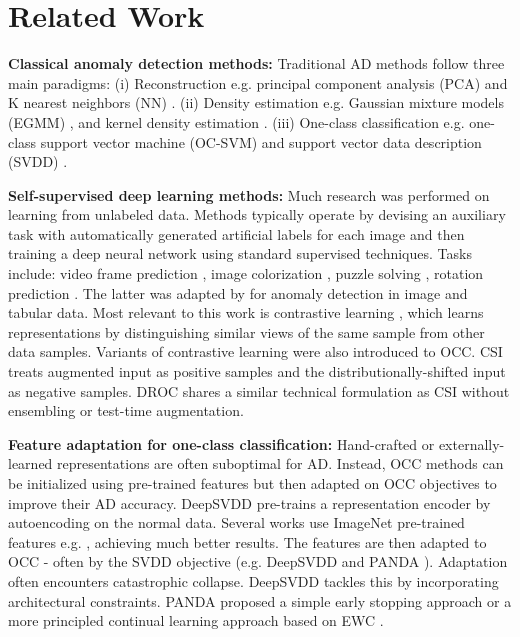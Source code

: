 \documentclass[letterpaper]{article} \usepackage{aaai23}  \usepackage{times}  \usepackage{helvet}  \usepackage{courier}  \usepackage[hyphens]{url}  \usepackage{graphicx} \usepackage{amsmath, amssymb}
\begin{document}
\section{Related Work}

\textbf{Classical anomaly detection methods:} Traditional AD methods follow three main paradigms: (i) Reconstruction e.g. principal component analysis (PCA) \cite{jolliffe2011principal} and K nearest neighbors (NN) \cite{eskin2002geometric}. (ii) Density estimation e.g. Gaussian mixture models (EGMM) \cite{glodek2013ensemble}, and kernel density estimation \cite{latecki2007outlier}. (iii) One-class classification e.g. one-class support vector machine (OC-SVM) \cite{scholkopf2000support} and support vector data description (SVDD) \cite{tax2004support}.

\textbf{Self-supervised deep learning methods:} Much research was performed on learning from unlabeled data. Methods typically operate by devising an auxiliary task with automatically generated artificial labels for each image and then training a deep neural network using standard supervised techniques. Tasks include: video frame prediction \cite{mathieu2015deep}, image colorization \cite{zhang2016colorful,larsson2016learning}, puzzle solving \cite{noroozi2016unsupervised},  rotation prediction \cite{gidaris2018unsupervised}. The latter was adapted by \cite{golan2018deep, hendrycks2019using, bergman2020classification} for anomaly detection in image and tabular data. Most relevant to this work is contrastive learning \cite{chen2020simple}, which learns representations by distinguishing similar views of the same sample from other data samples. Variants of contrastive learning were also introduced to OCC. CSI \cite{tack2020csi} treats augmented input as positive samples and the distributionally-shifted input as negative samples. DROC \cite{sohn2020learning} shares a similar technical formulation as CSI without ensembling or test-time augmentation.


\textbf{Feature adaptation for one-class classification:} Hand-crafted or externally-learned representations are often suboptimal for AD. Instead, OCC methods can be initialized using pre-trained features but then adapted on OCC objectives to improve their AD accuracy. DeepSVDD \cite{ruff2018deep} pre-trains a representation encoder by autoencoding on the normal data. Several works use ImageNet pre-trained features e.g. \cite{hendrycks2019using,perera2019learning,reiss2021panda}, achieving much better results. The features are then adapted to OCC - often by the SVDD objective (e.g. DeepSVDD \cite{ruff2018deep} and PANDA \cite{reiss2021panda}). Adaptation often encounters catastrophic collapse. DeepSVDD tackles this by incorporating architectural constraints. PANDA proposed a simple early stopping approach or a more principled continual learning approach based on EWC \cite{kirkpatrick2017overcoming}.
\end{document}
